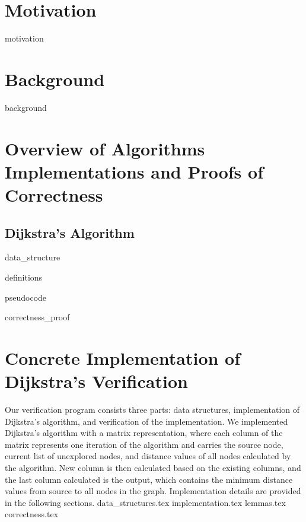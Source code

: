 \documentclass[11pt, a4paper]{article} %
\theoremstyle{definition}
\begin{document}
\section{Motivation}
{motivation}

\section{Background}
{background}

\section{Overview of Algorithms Implementations and Proofs of Correctness}
\subsection{Dijkstra's Algorithm}
{data_structure}

{definitions}

{pseudocode}

{correctness_proof}


\section{Concrete Implementation of Dijkstra's Verification}
Our verification program consists three parts: data structures, implementation of Dijkstra's algorithm, and verification of the implementation. We implemented Dijkstra's algorithm with a matrix representation, where each column of the matrix represents one iteration of the algorithm and carries the source node, current list of unexplored nodes, and distance values of all nodes calculated by the algorithm. New column is then calculated based on the existing columns, and the last column calculated is the output, which contains the minimum distance values from source to all nodes in the graph. Implementation details are provided in the following sections. 
{data_structures.tex}
{implementation.tex}
{lemmas.tex}
{correctness.tex}
\end{document}
